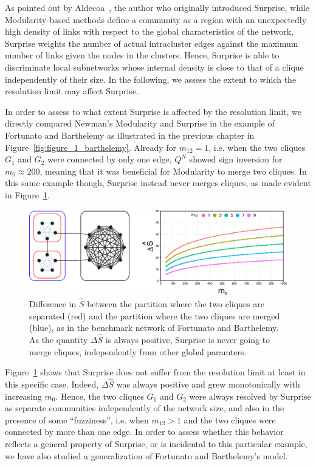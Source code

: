 As pointed out by Aldecoa~\cite{aldecoa2011}, the author who originally introduced Surprise, while Modularity-based methods define a community as a region with an unexpectedly high density of links with respect to the global characteristics of the network, Surprise weights the number of actual intracluster edges against the maximum number of links given the nodes in the clusters.
Hence, Surprise is able to discriminate local subnetworks whose internal density is close to that of a clique independently of their size.
In the following, we assess the extent to which the resolution limit may affect Surprise.

In order to assess to what extent Surprise is affected by the resolution limit, we directly compared Newman's Modularity and Surprise in the example of Fortunato and Barthelemy as illustrated in the previous chapter in Figure~\ref{fig:figure_1_barthelemy}. Already for $m_{12} = 1$, i.e. when the two cliques $G_1$ and $G_2$ were connected by only one edge, $Q^N$ showed sign inversion for $m_0 \approx 200$, meaning that it was beneficial for Modularity to merge two cliques.
In this same example though, Surprise instead never merges cliques, as made evident in Figure~\ref{fig:barthelemy_surprise}.

\begin{figure}[htb!]
\centering
\includegraphics[width=1.0\textwidth]{images/barthelemy_surprise.pdf}
\caption{Difference in $\hat{S}$ between the partition where the two cliques are separated (red) and the partition where the two cliques are merged (blue), as in the benchmark network of Fortunato and Barthelemy. As the quantity $\Delta \hat{S}$ is always positive, Surprise is never going to merge cliques, independently from other global paramters.}
\label{fig:barthelemy_surprise}
\end{figure}

Figure~\ref{fig:barthelemy_surprise} shows that Surprise does not suffer from the resolution limit at least in this specific case.
Indeed, $\Delta \hat{S}$ was always positive and grew monotonically with increasing $m_0$. 
Hence, the two cliques $G_1$ and $G_2$ were always resolved by Surprise as separate communities independently of the network size, and also in the presence of some ``fuzziness'', i.e. when $m_{12}>1$ and the two cliques were connected by more than one edge.
In order to assess whether this behavior reflects a general property of Surprise, or is incidental to this particular example, we have also studied a generalization of Fortunato and Barthelemy's model.

